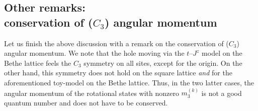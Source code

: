 \documentclass[10pt, a4paper, onecolumn]{article}
\begin{document}
\subsection{Other remarks:\\
conservation of ($C_3$) angular momentum}

Let us finish the above discussion with a remark on the conservation of ($C_3$) angular momentum.
We note that the hole moving via the $t$--$J^z$ model on the Bethe lattice feels the $C_3$ symmetry on all sites, except for the origin. On the other hand, this symmetry does not hold on the square lattice {\it and} for the aforementioned toy-model on the Bethe lattice.
Thus, in the two latter cases, the angular momentum of the rotational states with nonzero $m^{(k)}_{3}$ is not a good quantum number and does not have to be conserved. 


\end{document}
